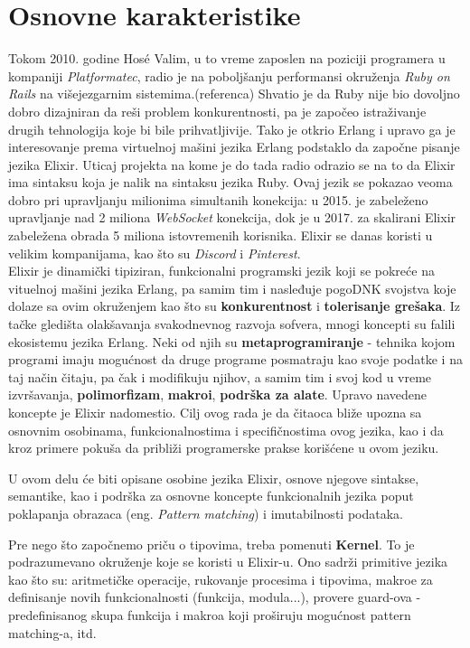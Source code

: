 \documentclass[12pt,oneside]{memoir}
\begin{document}
\section{Osnovne karakteristike}

Tokom 2010. godine Hosé Valim, u to vreme zaposlen na poziciji programera u kompaniji \textit{Platformatec}, radio je na poboljšanju performansi okruženja
\textit{Ruby on Rails} na višejezgarnim sistemima.(referenca) Shvatio je da Ruby nije bio dovoljno dobro dizajniran da reši problem konkurentnosti, pa je započeo istraživanje drugih tehnologija koje bi bile prihvatljivije. Tako je otkrio Erlang i upravo ga je interesovanje prema virtuelnoj mašini jezika Erlang podstaklo da započne pisanje jezika Elixir. Uticaj projekta na kome je do tada radio odrazio se na to da Elixir ima sintaksu koja je nalik na sintaksu jezika Ruby. Ovaj jezik se pokazao veoma dobro pri upravljanju
milionima simultanih konekcija: u 2015. je zabeleženo upravljanje nad 2 miliona \textit{WebSocket} konekcija, dok je u 2017. za skalirani Elixir zabeležena obrada 5 miliona istovremenih korisnika. Elixir se danas koristi u velikim kompanijama, kao što su \textit{Discord}  i \textit{Pinterest}.\\

Elixir je dinamički tipiziran, funkcionalni programski jezik koji se pokreće na vituelnoj mašini jezika Erlang, pa samim tim i nasleđuje pogoDNK svojstva koje dolaze sa ovim okruženjem kao što su \textbf{konkurentnost} i \textbf{tolerisanje grešaka}. Iz tačke gledišta olakšavanja svakodnevnog razvoja sofvera, mnogi koncepti su falili ekosistemu jezika Erlang. Neki od njih su \textbf{metaprogramiranje} - tehnika kojom programi imaju mogućnost da druge programe posmatraju kao svoje podatke i na taj način čitaju, pa
čak i modifikuju njihov, a samim tim i svoj kod u vreme izvršavanja, \textbf{polimorfizam}, \textbf{makroi}, \textbf{podrška za alate}. Upravo navedene koncepte je  Elixir nadomestio. Cilj ovog rada je da čitaoca bliže upozna sa osnovnim osobinama, funkcionalnostima i specifičnostima ovog jezika,  kao i da kroz primere pokuša da približi programerske prakse korišćene u ovom jeziku.

U ovom delu će biti opisane osobine jezika Elixir, osnove njegove sintakse, semantike, kao i podrška za osnovne koncepte funkcionalnih jezika poput poklapanja obrazaca (eng. \textit{Pattern matching}) i imutabilnosti podataka.

Pre nego što započnemo priču o tipovima, treba pomenuti \textbf{Kernel}. To je podrazumevano okruženje koje se koristi u Elixir-u. Ono sadrži primitive jezika kao što su: aritmetičke operacije, rukovanje procesima i tipovima, makroe za definisanje novih funkcionalnosti (funkcija, modula...), provere guard-ova - predefinisanog skupa funkcija i makroa koji proširuju
mogućnost pattern matching-a, itd.
\end{document}
